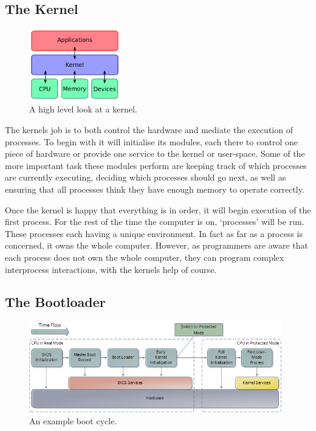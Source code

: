 \documentclass[a4paper]{report}
\begin{document}
\subsection{The Kernel}

\begin{figure}
\centering
\includegraphics[width=150px]{images/kernel}
\caption{A high level look at a kernel.}
\vspace{-10pt}
\label{fig:thekernel}
\end{figure}

The kernels job is to both control the hardware and mediate the execution of processes. To begin with it will initialise its modules, each there to control one piece of hardware or provide one service to the kernel or user-space. Some of the more important task these modules perform are keeping track of which processes are currently executing, deciding which processes should go next, as well as ensuring that all processes think they have enough memory to operate correctly.

Once the kernel is happy that everything is in order, it will begin execution of the first process. For the rest of the time the computer is on, `processes' will be run. These processes each having a unique environment. In fact as far as a process is concerned, it owns the whole computer. However, as programmers are aware that each process does not own the whole computer, they can program complex interprocess interactions, with the kernels help of course.



\clearpage
\subsection{The Bootloader}

\begin{figure}[ht]
\centering
\includegraphics[width=415px]{images/bootProcess.png}
\caption{An example boot cycle.}
\label{fig:theloader}
\end{figure}
\end{document}
